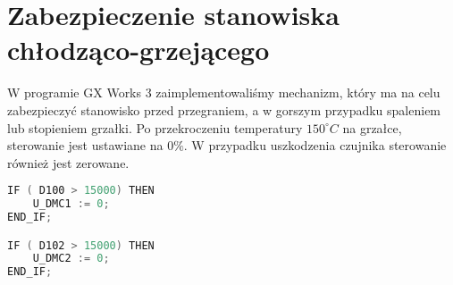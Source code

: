 \chapter{Zabezpieczenie stanowiska chłodząco-grzejącego}
\label{thermal_zabezpieczenie}
W programie GX Works 3 zaimplementowaliśmy mechanizm, który ma na celu zabezpieczyć stanowisko przed przegraniem, a w gorszym przypadku spaleniem lub stopieniem grzałki. Po przekroczeniu temperatury $150^{\circ} C$ na grzałce, sterowanie jest ustawiane na $0\%$. W przypadku uszkodzenia czujnika sterowanie również jest zerowane.  
\begin{lstlisting}[language=C]
IF ( D100 > 15000) THEN
	U_DMC1 := 0;
END_IF;

IF ( D102 > 15000) THEN
	U_DMC2 := 0;
END_IF;
\end{lstlisting}